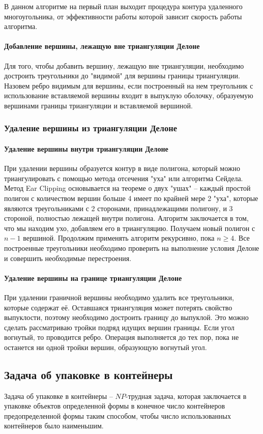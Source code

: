 \documentclass{fefu}
\begin{document}
В данном алгоритме на первый план выходит процедура контура удаленного многоугольника, от эффективности работы которой
зависит скорость работы алгоритма.
\paragraph{Добавление вершины, лежащую вне триангуляции Делоне}
\label{AddOutsideOfTriangulationVertex}
Для того, чтобы добавить вершину, лежащую вне триангуляции, необходимо достроить треугольники до "видимой" для вершины
границы триангуляции. Назовем ребро видимым для вершины, если построенный на нем треугольник с использование вставляемой
вершины  входит в выпуклую оболочку, образуемую вершинами границы триангуляции и вставляемой вершиной.
\subsubsection{Удаление вершины из триангуляции Делоне}
\paragraph{Удаление вершины внутри триангуляции Делоне}
При удалении вершины образуется контур в виде полигона, который можно триангулировать с помощью метода отсечения
"уха" \cite{EarClipping} или алгоритма Сейдела\cite{Seidel}. Метод Ear Clipping основывается на теореме о двух "ушах" --
каждый простой полигон с количеством вершин больше 4 имеет по крайней мере 2 "уха", которые являются треугольниками с 2
сторонами, принадлежащими полигону, и 3 стороной, полностью лежащей внутри полигона. Алгоритм заключается в том, что
мы находим ухо, добавляем его в триангуляцию. Получаем новый полигон с $n - 1$ вершиной. Продолжим применять алгоритм
рекурсивно, пока $n \geq 4$. Все построенные треугольники необходимо проверить на выполнение условия Делоне и совершить
необходимые перестроения.
\paragraph{Удаление вершины на границе триангуляции Делоне}
При удалении граничной вершины необходимо удалить все треугольники, которые содержат её. Оставшаяся триангуляция может
потерять свойство выпуклости, поэтому необходимо достроить границу до выпуклой. Это можно сделать рассматриваю тройки
подряд идущих вершин границы. Если угол вогнутый, то проводится ребро. Операция выполняется до тех пор, пока не останется
ни одной тройки вершин, образующую вогнутый угол.
\subsection{Задача об упаковке в контейнеры}
Задача об упаковке в контейнеры -- $NP$-трудная задача, которая заключается в упаковке объектов определенной формы в
конечное число контейнеров предопределенной формы таким способом, чтобы число использованных контейнеров было
наименьшим.
\end{document}
